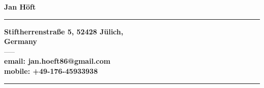 \documentclass[phd]{UWMThesis}
\renewcommand{\.}{\textrm{ .}}
\theoremstyle{definition}
\numberwithin{thm}{chapter}
\begin{document}
	
	\begin{ThesisCV} %
		
		{\centering \large \textbf{Jan H\"oft}\\}
		\vspace{0.5cm}
		\hrule
		\begin{center}
				\textbf{Stiftherrenstra\ss e 5, 52428 J\"ulich,}\\ 
				\textbf{Germany}\\
				\vspace{0.1cm}
				-----\\
				\vspace{0.1cm}
				\textbf{email: jan.hoeft86@gmail.com}\\
				\textbf{mobile: +49-176-45933938}
		\end{center}
		\hrule
		\vspace{1cm}


\end{ThesisCV}
\end{document}
